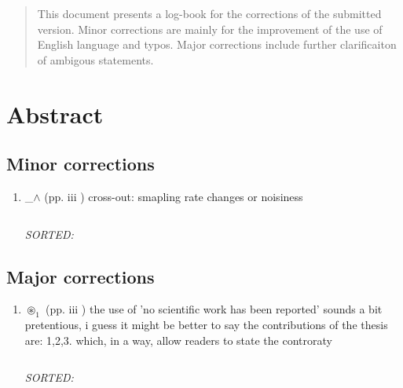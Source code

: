 \documentclass[12pt]{article}
\begin{document}
\maketitle


\begin{abstract}
This document presents a log-book for the corrections
of the submitted version.
Minor corrections are mainly for the improvement of the use of  English language
and typos.
Major corrections include further clarificaiton of 
ambigous statements.
\end{abstract}

\tableofcontents
\newpage




\section{Abstract}

\subsection{Minor corrections}
\begin{enumerate}
\item   \_$\wedge$  
	(pp. iii )
	cross-out: smapling rate changes or noisiness
	\begin{verbatim}

	\end{verbatim}
	\textit{
	SORTED:
	}
	\\
	
\end{enumerate}


\subsection{Major corrections}
\begin{enumerate}
\item $\circledast_1$ (pp. iii )
	the use of 'no scientific work has been reported'
	sounds a bit pretentious, i guess it might be better
	to say the contributions of the thesis are: 1,2,3.
	which, in a way, allow readers to state the controraty
	\begin{verbatim}

	\end{verbatim}
	\textit{
	SORTED:  
	}
	\\
	
\end{enumerate}
\end{document}
